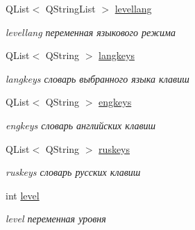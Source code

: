 \begin{DoxyCompactItemize}
\mbox{\label{class_main_window_af7ce4e59c1cf0754f683d6fcd8756c80}} 
Q\+List$<$ Q\+String\+List $>$ \mbox{\hyperlink{class_main_window_af7ce4e59c1cf0754f683d6fcd8756c80}{levellang}}
\begin{DoxyCompactList}\small\item\em levellang переменная языкового режима \end{DoxyCompactList}\item 
\mbox{\label{class_main_window_aa27ed7ea7ea3a0916662e25b04deccbe}} 
Q\+List$<$ Q\+String $>$ \mbox{\hyperlink{class_main_window_aa27ed7ea7ea3a0916662e25b04deccbe}{langkeys}}
\begin{DoxyCompactList}\small\item\em langkeys словарь выбранного языка клавиш \end{DoxyCompactList}\item 
\mbox{\label{class_main_window_af295d32c96f61ae93f9c46da578eccb3}} 
Q\+List$<$ Q\+String $>$ \mbox{\hyperlink{class_main_window_af295d32c96f61ae93f9c46da578eccb3}{engkeys}}
\begin{DoxyCompactList}\small\item\em engkeys словарь английских клавиш \end{DoxyCompactList}\item 
\mbox{\label{class_main_window_aa42ff6f96d34df75ada0ade0ce0322bb}} 
Q\+List$<$ Q\+String $>$ \mbox{\hyperlink{class_main_window_aa42ff6f96d34df75ada0ade0ce0322bb}{ruskeys}}
\begin{DoxyCompactList}\small\item\em ruskeys словарь русских клавиш \end{DoxyCompactList}\item 
\mbox{\label{class_main_window_a549f4ff978d8f887fcc7093f746b54d3}} 
int \mbox{\hyperlink{class_main_window_a549f4ff978d8f887fcc7093f746b54d3}{level}}
\begin{DoxyCompactList}\small\item\em level переменная уровня \end{DoxyCompactList}\item 
\mbox{\label{class_main_window_a56d8727651a8b002ebff58e79e5ef26f}} 

\end{DoxyCompactItemize}
